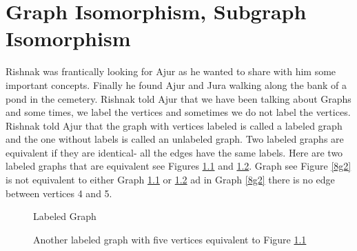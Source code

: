 \chapter{Graph Isomorphism, Subgraph Isomorphism}

Rishnak was frantically looking for Ajur as he wanted to share with him some important concepts. Finally he found Ajur and Jura walking along the bank of a pond in the cemetery. Rishnak told Ajur that we have been talking about Graphs and some times, we label the vertices and sometimes we do not label the vertices. Rishnak told Ajur that the graph with vertices labeled is called a labeled graph and the one without labels is called an unlabeled graph. Two labeled graphs are equivalent if they are identical- all the edges have the same labels. Here are two labeled graphs that are equivalent see Figures \ref{8g1} and \ref{8g11}. Graph see Figure \ref{8g2} is not equivalent to either Graph \ref{8g1} or \ref{8g11} ad in Graph \ref{8g2} there is no edge between vertices 4 and 5.
\begin{figure}
\begin{center}
\caption{Labeled Graph}\label{8g1}
\end{center}

\end{figure}
\begin{figure}
\begin{center}
\caption{ Another labeled graph with five vertices equivalent to Figure \ref{8g1}}\label{8g11}
\end{center}
\end{figure}

